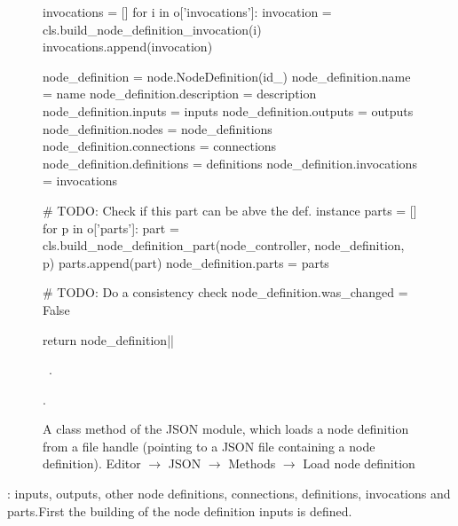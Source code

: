 \documentclass[%
    a4paper,    %
    justified,  %
    nobib,      %
    openany     %
]{tufte-book}
\begin{document}
\begin{figure}
\begin{flushleft}
\begin{minipage}{\linewidth}
\begin{pythoncode}
    invocations = []
    for i in o['invocations']:
        invocation = cls.build_node_definition_invocation(i)
        invocations.append(invocation)

    node_definition             = node.NodeDefinition(id_)
    node_definition.name        = name
    node_definition.description = description
    node_definition.inputs      = inputs
    node_definition.outputs     = outputs
    node_definition.nodes       = node_definitions
    node_definition.connections = connections
    node_definition.definitions = definitions
    node_definition.invocations = invocations

    # TODO: Check if this part can be abve the def. instance
    parts = []
    for p in o['parts']:
        part = cls.build_node_definition_part(node_controller, node_definition, p)
        parts.append(part)
    node_definition.parts = parts

    # TODO: Do a consistency check
    node_definition.was_changed = False

    return node_definition|\NWsep|
\end{pythoncode}
\vspace{1.5ex}
\footnotesize
\begin{list}{}{\setlength{\itemsep}{-\parsep}\setlength{\itemindent}{-\leftmargin}}
\item \NWtxtMacroDefBy\ .
\item {\NWtxtMacroNoRef}.

\item{}
\end{list}
\end{minipage}\vspace{4ex}
\end{flushleft}
\caption{A class method of the JSON module, which loads a node definition from a
  file handle (pointing to a JSON file containing a node definition).
  \newline{}\newline{}Editor $\rightarrow$ JSON $\rightarrow$
  Methods $\rightarrow$ Load node definition}
\label{editor:lst:json:methods:load-node-definition}
\end{figure}

: inputs, outputs,
other node definitions, connections, definitions, invocations and parts.First
the building of the node definition inputs is defined.
\end{document}
